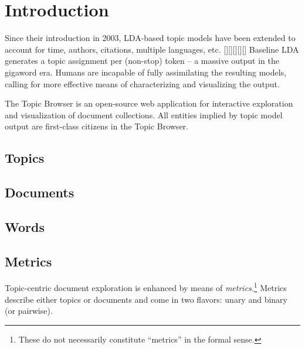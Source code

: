 \section{Introduction}
Since their introduction in 2003, LDA-based topic models have been extended to
account for time, authors, citations, multiple languages, etc. [][][][][]
Baseline LDA generates a topic assignment per (non-stop) token -- a massive
output in the gigaword era. Humans are incapable of fully assimilating the
resulting models, calling for more effective means of characterizing and
visualizing the output.

The Topic Browser is an open-source web application for interactive exploration
and visualization of document collections. All entities implied by topic model output are first-class citizens in the Topic
Browser. 


\subsection{Topics}

\subsection{Documents}

\subsection{Words}

\subsection{Metrics}
Topic-centric document exploration is enhanced by means of \textit{metrics}.\footnote{These do not necessarily constitute ``metrics'' in the formal sense.} Metrics describe either topics or documents and come in two flavors: unary and binary (or pairwise). 

